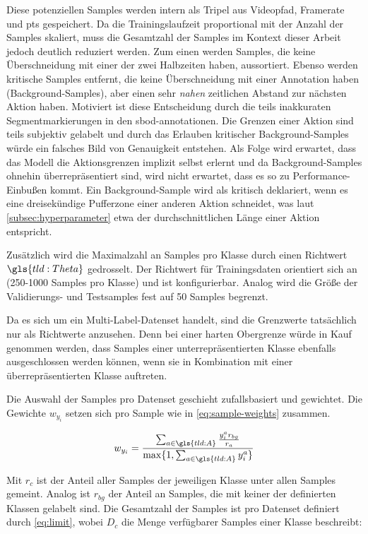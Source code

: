 Diese potenziellen Samples werden intern als Tripel aus Videopfad, Framerate und \gls{pts} gespeichert.
Da die Trainingslaufzeit proportional mit der Anzahl der Samples skaliert, muss die Gesamtzahl der Samples im Kontext dieser Arbeit jedoch deutlich reduziert werden.
Zum einen werden Samples, die keine Überschneidung mit einer der zwei Halbzeiten haben, aussortiert.
Ebenso werden kritische Samples entfernt, die keine Überschneidung mit einer Annotation haben (Background-Samples), aber einen sehr \emph{nahen} zeitlichen Abstand zur nächsten Aktion haben.
Motiviert ist diese Entscheidung durch die teils inakkuraten Segmentmarkierungen in den \gls{sbod}-\gls{annotationen}.
Die Grenzen einer Aktion sind teils subjektiv gelabelt und durch das Erlauben kritischer Background-Samples würde ein falsches Bild von Genauigkeit entstehen.
Als Folge wird erwartet, dass das Modell die Aktionsgrenzen implizit selbst erlernt und da Background-Samples ohnehin überrepräsentiert sind, wird nicht erwartet, dass es so zu Performance-Einbußen kommt.
Ein Background-Sample wird als kritisch deklariert, wenn es eine dreisekündige Pufferzone einer anderen Aktion schneidet, was laut \autoref{subsec:hyperparameter} etwa der durchschnittlichen Länge einer Aktion entspricht.

Zusätzlich wird die Maximalzahl an Samples pro Klasse durch einen Richtwert $\gls{tld:Theta}$ gedrosselt.
Der Richtwert für Trainingsdaten orientiert sich an~\cite{Kay17} (250-1000 Samples pro Klasse) und ist konfigurierbar.
Analog wird die Größe der Validierungs- und Testsamples fest auf 50  Samples begrenzt.

Da es sich um ein Multi-Label-Datenset handelt, sind die Grenzwerte tatsächlich nur als Richtwerte anzusehen.
Denn bei einer harten Obergrenze würde in Kauf genommen werden, dass Samples einer unterrepräsentierten Klasse ebenfalls ausgeschlossen werden können, wenn sie in Kombination mit einer überrepräsentierten Klasse auftreten.

Die Auswahl der Samples pro Datenset geschieht zufallsbasiert und gewichtet.
Die Gewichte $w_{y_i}$ setzen sich pro Sample wie in \autoref{eq:sample-weights} zusammen.

\begin{equation}
    \label{eq:sample-weights}
    w_{y_i} = \frac{\sum_{a \in \gls{tld:A}} \frac{y_i^a r_{bg}}{r_a} }{\max \{1, \sum_{a \in \gls{tld:A}} y_i^a\}}
\end{equation}

Mit $r_{c}$ ist der Anteil aller Samples der jeweiligen Klasse unter allen Samples gemeint.
Analog ist $r_{bg}$ der Anteil an Samples, die mit keiner der definierten Klassen gelabelt sind.
Die Gesamtzahl der Samples ist pro Datenset definiert durch \autoref{eq:limit}, wobei $D_c$ die Menge verfügbarer Samples einer Klasse beschreibt:

